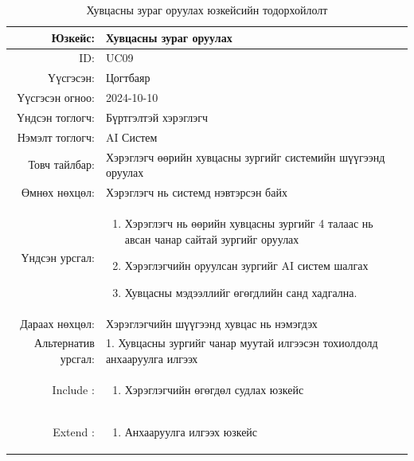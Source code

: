 \begin{longtable}{|r|p{11.5cm}|}
    \caption{Хувцасны зураг оруулах юзкейсийн тодорхойлолт} 
    \label{table:songolt4}\\ \hline
    {Юзкейс:} & {Хувцасны зураг оруулах}\\ \hline
    {ID:} & {UC09}\\ \hline
    {Үүсгэсэн:} & {Цогтбаяр}\\ \hline
    {Үүсгэсэн огноо:} & {2024-10-10}\\ \hline
    {Үндсэн тоглогч:} & {Бүртгэлтэй хэрэглэгч}\\ \hline
    {Нэмэлт тоглогч:} & {AI Систем}\\ \hline
    {Товч тайлбар:} & {Хэрэглэгч өөрийн хувцасны зургийг системийн шүүгээнд оруулах}\\ \hline
    {Өмнөх нөхцөл:} & {Хэрэглэгч нь системд нэвтэрсэн байх}\\ \hline
    {Үндсэн урсгал:} & {\begin{enumerate}
        \item Хэрэглэгч нь өөрийн хувцасны зургийг 4 талаас нь авсан чанар сайтай зургийг оруулах
    \item Хэрэглэгчийн оруулсан зургийг AI систем шалгах
    \item Хувцасны мэдээллийг өгөгдлийн санд хадгална.\end{enumerate}}\\ \hline
    {Дараах нөхцөл:} & {Хэрэглэгчийн шүүгээнд хувцас нь нэмэгдэх}\\ \hline
    {Альтернатив урсгал:} & {1. Хувцасны зургийг чанар муутай илгээсэн тохиолдолд анхааруулга илгээх}\\ \hline
     {Include :} & {\begin{enumerate}
        \item Хэрэглэгчийн өгөгдөл судлах юзкейс
    \end{enumerate}}\\ \hline
     {Extend :} & {\begin{enumerate}
        \item Анхааруулга илгээх юзкейс
    \end{enumerate}}\\ \hline
\end{longtable}
\newpage
